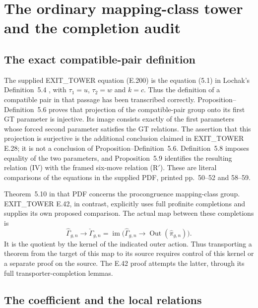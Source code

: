 \section{The ordinary mapping-class tower and the completion audit}
\label{sec:tower-audit}

\subsection{The exact compatible-pair definition}

The supplied EXIT\_TOWER equation (E.200) is the equation (5.1) in
Lochak's Definition~5.4 \cite{Lochak2025Aut}, with
$\tau _1=u$, $\tau _2=w$ and $k=c$.
Thus the definition of a compatible pair in that passage has been
transcribed correctly.  Proposition--Definition~5.6 proves that projection
of the compatible-pair group onto its first GT parameter is injective.
Its image consists exactly of the first parameters whose forced second
parameter satisfies the GT relations.  The assertion that this projection
is surjective is the additional conclusion claimed in EXIT\_TOWER E.28;
it is not a conclusion of Proposition--Definition~5.6.  Definition~5.8
imposes equality of the two parameters, and Proposition~5.9 identifies the
resulting relation (IV) with the framed six-move relation (R$'$).
These are literal comparisons of the equations in the supplied PDF,
printed pp.~50--52 and 58--59.

Theorem~5.10 in that PDF concerns the procongruence mapping-class group.
EXIT\_TOWER E.42, in contrast, explicitly uses full profinite completions
and supplies its own proposed comparison.  The actual map between these
completions is
\[
 \widehat\Gamma_{g,n}\longrightarrow\check\Gamma_{g,n}
 =\operatorname{im}\bigl(\widehat\Gamma_{g,n}
             \longrightarrow\operatorname{Out}(\widehat\pi_{g,n})\bigr).
\]
It is the quotient by the kernel of the indicated outer action.  Thus
transporting a theorem from the target of this map to its source requires
control of this kernel or a separate proof on the source.  The E.42 proof
attempts the latter, through its full transporter-completion lemmas.

\subsection{The coefficient and the local relations}

